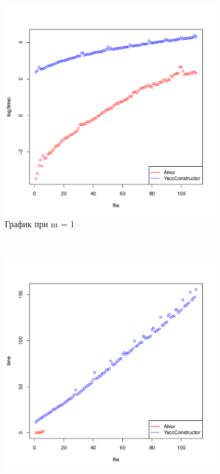 \documentclass{matmex-diploma}
\begin{document}
\begin{figure}
        \centering
        \begin{subfigure}[b]{0.3\textwidth}
                \includegraphics[width=\textwidth]{m=1_YC_Alvor.pdf}
                \caption{График при m = 1}
                \label{fig:m=1_YC_Alvor}
        \end{subfigure}%
        ~ %
        \begin{subfigure}[b]{0.3\textwidth}
                \includegraphics[width=\textwidth]{m=2_YC_Alvor}

\end{subfigure}
\end{figure}
\end{document}
